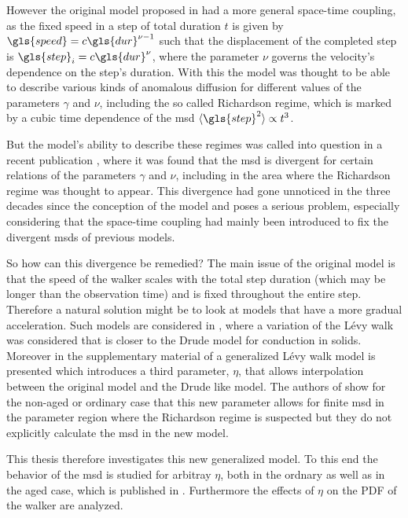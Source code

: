 However the original model proposed in \cite{shlesinger1987} had a more general space-time coupling, as the fixed speed in a step of total duration $t$ is given by $\gls{speed} = c  \gls{dur}^{\nu-1}$ such that the displacement of the completed step is $\gls{step}_i = c \gls{dur}^{\nu}$, where the parameter $\nu$ governs the velocity's dependence on the step's duration. With this the model was thought to be able to describe various kinds of anomalous diffusion for different values of the parameters $\gamma$ and $\nu$, including the so called Richardson regime, which is marked by a cubic time dependence of the \gls{msd} $\mean{\gls{step}^2} \propto t^3$. 

But the model's ability to describe these regimes was called into question in a recent publication \cite{radons2018}, where it was found that the \gls{msd} is divergent for certain relations of the parameters $\gamma$ and $\nu$, including in the area where the Richardson regime was thought to appear. This divergence had gone unnoticed in the three decades since the conception of the model and poses a serious problem, especially considering that the space-time coupling had mainly been introduced to fix the divergent \gls{msd}s of previous models. 

So how can this divergence be remedied? The main issue of the original model is that the speed of the walker scales with the total step duration (which may be longer than the observation time) and is fixed throughout the entire step. Therefore a natural solution might be to look at models that have a more gradual acceleration. Such models are considered in \cite{BarkaiKlafterBuch,schulz1997}, where a variation of the L\'evy walk was considered that is closer to the Drude model for conduction in solids.\\
Moreover in the supplementary material of \cite{radons2018} a generalized L\'evy walk model is presented which introduces a third parameter, $\eta$, that allows interpolation between the original model and the Drude like model. The authors of \cite{radons2018} show for the non-aged or ordinary case that this new parameter allows for finite \gls{msd} in the parameter region where the Richardson regime is suspected but they do not explicitly calculate the \gls{msd} in the new model.
  
This thesis therefore investigates this new generalized model. To this end the behavior of the \gls{msd} is studied for arbitray $\eta$, both in the ordnary as well as in the aged case, which is published in \cite{bothe}. Furthermore the effects of $\eta$ on the \gls{PDF} of the walker are analyzed.


